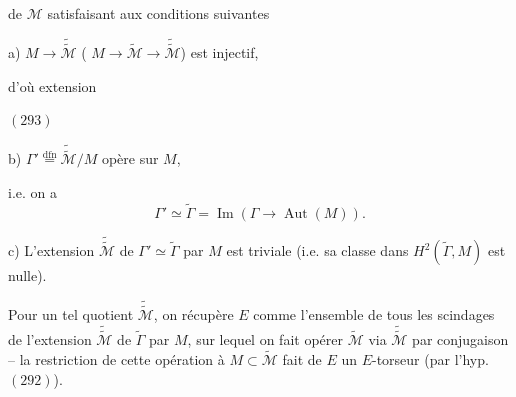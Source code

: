 

de $\mathcal M$ satisfaisant aux conditions suivantes

\par a) $M\longrightarrow\widetilde{\widetilde{\mathcal M}}$ ( $M\longrightarrow\widetilde{\mathcal M}\longrightarrow\widetilde{\widetilde{\mathcal M}}$) est injectif,

\par {}

\par d'où extension

\par $(293)$\quad
{}

\par b)  $\Gamma'\overset{\mathrm{dfn}}{=}\widetilde{\widetilde{\mathcal M}}/M$ opère \uline{} sur $M$,

\par i.e. on a
\[
\Gamma'\simeq\widetilde\Gamma=\operatorname{Im}(\Gamma\longrightarrow\operatorname{Aut}(M)).
\]

\par c) L'extension $\widetilde{\widetilde{\mathcal M}}$ de $\Gamma'\simeq\widetilde\Gamma$ par $M$ est triviale (i.e. sa classe dans $H^2(\widetilde\Gamma,M)$ est nulle).

\par Pour un tel quotient $\widetilde{\widetilde{\mathcal M}}$, on récupère $E$ comme l'ensemble de tous les scindages de l'extension $\widetilde{\widetilde{\mathcal M}}$ de $\widetilde\Gamma$ par $M$,  sur lequel on fait opérer $\widetilde{\mathcal M}$ via $\widetilde{\widetilde{\mathcal M}}$ par conjugaison -- la restriction de cette opération à $M\subset\widetilde{\mathcal M}$ fait de $E$ un $E$-torseur (par l'hyp. $(292)$).


